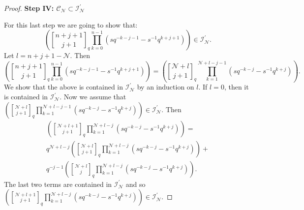 \documentclass[10pt,a4paper]{amsart}
\newcommand{\cC}{\mathcal{C}}
\newcommand{\cI}{\mathcal{I}}
\newcommand{\cN}{\mathcal{N}}
\begin{document}
\begin{proof}
\par
%
{\bf Step IV: $\cC_{\cN}\subset \cI_{\cN}^\prime$} 
%
\par
For this last step we are going to show that:
\begin{equation*}
\left( {n+j+1 \brack j+1}_q \prod_{k=0}^{n-1}(sq^{-k-j-1}-s^{-1}q^{k+j+1}) \right) 
\in \cI_\cN^\prime.
\end{equation*}
Let $l = n+j+1 - \cN$.  
Then
\begin{equation*}
\left( {n+j+1 \brack j+1}_q \prod_{k=0}^{n-1}(sq^{-k-j-1}-s^{-1}q^{k+j+1}) \right)
=
\left( {\cN+l \brack j+1}_q \prod_{k=1}^{\cN+l-j-1}(sq^{-k-j}-s^{-1}q^{k+j}) \right).
\end{equation*}
We show that the above is contained in $\cI_\cN^\prime$ by an induction on $l$.  
If $l=0$, then it is contained in $\cI_\cN^\prime$.  
Now we assume that $\left( {\cN+l \brack j+1}_q \prod_{k=1}^{\cN+l-j-1}(sq^{-k-j}-s^{-1}q^{k+j}) \right) \in \cI_\cN^\prime$.  
Then
\begin{multline*}
\left( {\cN+l+1 \brack j+1}_q \prod_{k=1}^{\cN+l-j}(sq^{-k-j}-s^{-1}q^{k+j}) \right)
=
\\
q^{\cN+l-j}\left( {\cN+l \brack j+1}_q \prod_{k=1}^{\cN+l-j}(sq^{-k-j}-s^{-1}q^{k+j}) \right)
+
\\
q^{-j-1}\left( {\cN+l \brack j}_q \prod_{k=1}^{\cN+l-j}(sq^{-k-j}-s^{-1}q^{k+j}) \right).  
\end{multline*}
The last  two terms are contained in $\cI_\cN^\prime$ and so
$\left( {\cN+l+1 \brack j+1}_q \prod_{k=1}^{\cN+l-j}(sq^{-k-j}-s^{-1}q^{k+j}) \right) \in \cI_\cN^\prime$.  
\end{proof}
\end{document}
